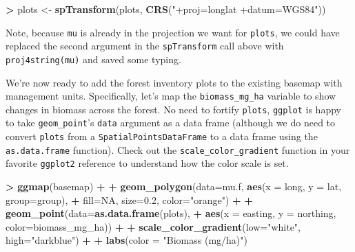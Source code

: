 \documentclass[]{krantz}
\makeatletter
\newenvironment{Shaded}{\begin{snugshade}}{\end{snugshade}}
\newcommand{\DataTypeTok}[1]{\textcolor[rgb]{0.27,0.27,0.27}{#1}}
\newcommand{\FloatTok}[1]{\textcolor[rgb]{0.06,0.06,0.06}{#1}}
\newcommand{\KeywordTok}[1]{\textcolor[rgb]{0.27,0.27,0.27}{\textbf{#1}}}
\newcommand{\NormalTok}[1]{#1}
\newcommand{\OperatorTok}[1]{\textcolor[rgb]{0.43,0.43,0.43}{\textbf{#1}}}
\newcommand{\OtherTok}[1]{\textcolor[rgb]{0.37,0.37,0.37}{#1}}
\newcommand{\StringTok}[1]{\textcolor[rgb]{0.5,0.5,0.5}{#1}}
\newenvironment{kframe}{%
\medskip{}
\setlength{\fboxsep}{.8em}
 \def\at@end@of@kframe{}%
 \ifinner\ifhmode%
  \def\at@end@of@kframe{\end{minipage}}%
  \begin{minipage}{\columnwidth}%
 \fi\fi%
 \def\FrameCommand##1{\hskip\@totalleftmargin \hskip-\fboxsep
 \colorbox{shadecolor}{##1}\hskip-\fboxsep
     \hskip-\linewidth \hskip-\@totalleftmargin \hskip\columnwidth}%
 \MakeFramed {\advance\hsize-\width
   \@totalleftmargin\z@ \linewidth\hsize
   \@setminipage}}%
 {\par\unskip\endMakeFramed%
 \at@end@of@kframe}
\renewenvironment{Shaded}{\begin{kframe}}{\end{kframe}}
\makeatother
\begin{document}
\begin{Shaded}
\begin{Highlighting}[]
\OperatorTok{>}\StringTok{ }\NormalTok{plots <-}\StringTok{ }\KeywordTok{spTransform}\NormalTok{(plots, }\KeywordTok{CRS}\NormalTok{(}\StringTok{"+proj=longlat +datum=WGS84"}\NormalTok{))}
\end{Highlighting}
\end{Shaded}

Note, because \texttt{mu} is already in the projection we want for \texttt{plots}, we could have replaced the second argument in the \texttt{spTransform} call above with \texttt{proj4string(mu)} and saved some typing.

We're now ready to add the forest inventory plots to the existing basemap with management units. Specifically, let's map the \texttt{biomass\_mg\_ha} variable to show changes in biomass across the forest. No need to fortify \texttt{plots}, \texttt{ggplot} is happy to take \texttt{geom\_point}'s \texttt{data} argument as a data frame (although we do need to convert \texttt{plots} from a \texttt{SpatialPointsDataFrame} to a data frame using the \texttt{as.data.frame} function). Check out the \texttt{scale\_color\_gradient} function in your favorite \texttt{ggplot2} reference to understand how the color scale is set.

\begin{Shaded}
\begin{Highlighting}[]
\OperatorTok{>}\StringTok{ }\KeywordTok{ggmap}\NormalTok{(basemap) }\OperatorTok{+}
\OperatorTok{+}\StringTok{     }\KeywordTok{geom_polygon}\NormalTok{(}\DataTypeTok{data=}\NormalTok{mu.f, }\KeywordTok{aes}\NormalTok{(}\DataTypeTok{x =}\NormalTok{ long, }\DataTypeTok{y =}\NormalTok{ lat, }\DataTypeTok{group=}\NormalTok{group), }
\OperatorTok{+}\StringTok{                  }\DataTypeTok{fill=}\OtherTok{NA}\NormalTok{, }\DataTypeTok{size=}\FloatTok{0.2}\NormalTok{, }\DataTypeTok{color=}\StringTok{"orange"}\NormalTok{) }\OperatorTok{+}
\OperatorTok{+}\StringTok{     }\KeywordTok{geom_point}\NormalTok{(}\DataTypeTok{data=}\KeywordTok{as.data.frame}\NormalTok{(plots), }
\OperatorTok{+}\StringTok{                }\KeywordTok{aes}\NormalTok{(}\DataTypeTok{x =}\NormalTok{ easting, }\DataTypeTok{y =}\NormalTok{ northing, }\DataTypeTok{color=}\NormalTok{biomass_mg_ha)) }\OperatorTok{+}\StringTok{ }
\OperatorTok{+}\StringTok{     }\KeywordTok{scale_color_gradient}\NormalTok{(}\DataTypeTok{low=}\StringTok{"white"}\NormalTok{, }\DataTypeTok{high=}\StringTok{"darkblue"}\NormalTok{) }\OperatorTok{+}
\OperatorTok{+}\StringTok{     }\KeywordTok{labs}\NormalTok{(}\DataTypeTok{color =} \StringTok{"Biomass (mg/ha)"}\NormalTok{)}
\end{Highlighting}
\end{Shaded}
\end{document}

